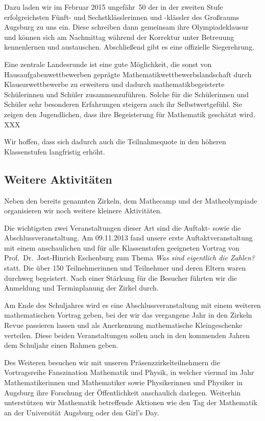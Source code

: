 \documentclass[12pt]{zettel}
\begin{document}
Dazu laden wir im Februar 2015 ungefähr~50 der in der zweiten Stufe
erfolgreichsten Fünft- und Sechstklässlerinnen und -klässler des Großraums
Augsburg zu uns ein. Diese schreiben dann gemeinsam ihre Olympiadeklausur und
können sich am Nachmittag während der Korrektur unter Betreuung kennenlernen
und austauschen. Abschließend gibt es eine offizielle Siegerehrung.

Eine zentrale Landesrunde ist eine gute Möglichkeit, die sonst von
Hausaufgabenwettbewerben geprägte Mathematikwettbewerbslandschaft durch
Klausurwettbewerbe zu erweitern und dadurch mathematikbegeisterte Schülerinnen
und Schüler zusammenzuführen. Solche für die Schülerinnen und Schüler
sehr besonderen Erfahrungen steigern auch ihr Selbstwertgefühl. Sie zeigen
den Jugendlichen, dass ihre Begeisterung für Mathematik geschätzt wird. XXX

Wir hoffen, dass sich dadurch auch die Teilnahmequote
in den höheren Klassenstufen langfristig erhöht.


\subsection{Weitere Aktivitäten}

Neben den bereits genannten Zirkeln, dem Mathecamp und der
Matheolympiade organisieren wir noch weitere kleinere
Aktivitäten.

Die wichtigsten zwei Veranstaltungen dieser Art sind die Auftakt- sowie die
Abschlussveranstaltung. Am 09.11.2013 fand unsere erste
Auftaktveranstaltung mit einem anschaulichen und für alle Klassenstufen
geeigneten Vortrag von
Prof.~Dr.~Jost-Hinrich Eschenburg zum Thema \emph{Was sind eigentlich die
Zahlen?} statt.
Die über 150 Teilnehmerinnen und Teilnehmer und deren Eltern waren durchweg
begeistert. Nach einer Stärkung für die Besucher führten wir
die Anmeldung und Terminplanung der Zirkel durch.

Am Ende des Schuljahres wird es eine Abschlussveranstaltung mit einem
weiteren mathematischen Vortrag geben, bei der wir
das vergangene Jahr in den Zirkeln Revue passieren lassen und als Anerkennung
mathematische Kleingeschenke verteilen. Diese beiden Veranstaltungen sollen
auch in den kommenden Jahren dem Schuljahr einen Rahmen geben.

Des Weiteren besuchen wir mit unseren Präsenzzirkelteilnehmern die
Vortragsreihe Fanszination Mathematik und Physik, in welcher viermal im
Jahr Mathematikerinnen und Mathematiker sowie Physikerinnen und Physiker in Augsburg ihre Forschung der
Öffentlichkeit anschaulich darlegen. Weiterhin unterstützen wir
Mathematik betreffende Aktionen wie den Tag der Mathematik an
der Universität Augsburg oder den Girl's Day.
\end{document}

